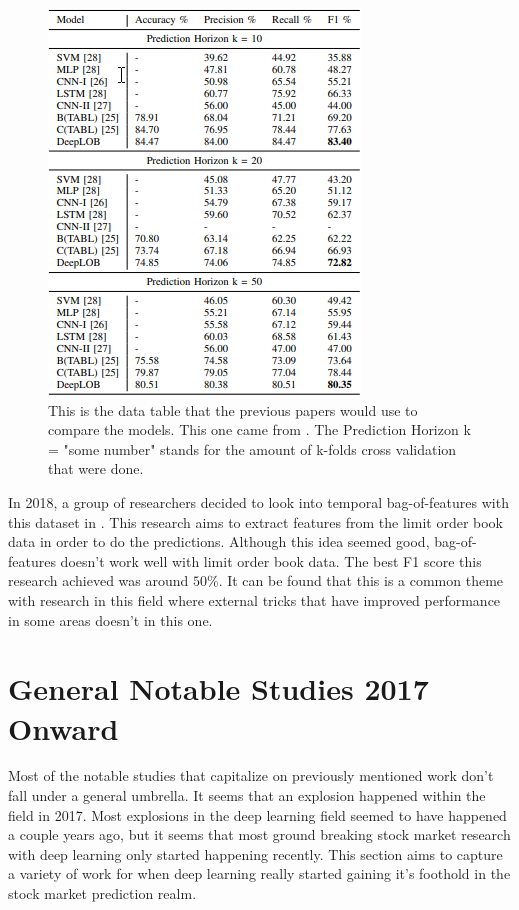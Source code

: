\documentclass{article}
\theoremstyle{plain}
\theoremstyle{definition}
\numberwithin{equation}{section}
\numberwithin{theorem}{section}
\numberwithin{lemma}{section}
\numberwithin{definition}{section}
\numberwithin{proposition}{section}
\numberwithin{corollary}{section}
\begin{document}
	\begin{figure}[h]
		\includegraphics[width=\linewidth]{fi2010}
		\caption{This is the data table that the previous papers would use to compare the models. This one came from \cite{deepLOB}. The Prediction Horizon k = "some number" stands for the amount of k-folds cross validation that were done.}
	\end{figure}
	
	
	In 2018, a group of researchers decided to look into temporal bag-of-features with this dataset in \cite{Passalis2018}. This research aims to extract features from the limit order book data in order to do the predictions. Although this idea seemed good, bag-of-features doesn't work well with limit order book data. The best F1 score this research achieved was around $50\%$. It can be found that this is a common theme with research in this field where external tricks that have improved performance in some areas doesn't in this one.
	
	\section{General Notable Studies 2017 Onward}
	Most of the notable studies that capitalize on previously mentioned work don't fall under a general umbrella. It seems that an explosion happened within the field in 2017. Most explosions in the deep learning field seemed to have happened a couple years ago, but it seems that most ground breaking stock market research with deep learning only started happening recently. This section aims to capture a variety of work for when deep learning really started gaining it's foothold in the stock market prediction realm. 
	
\end{document}
